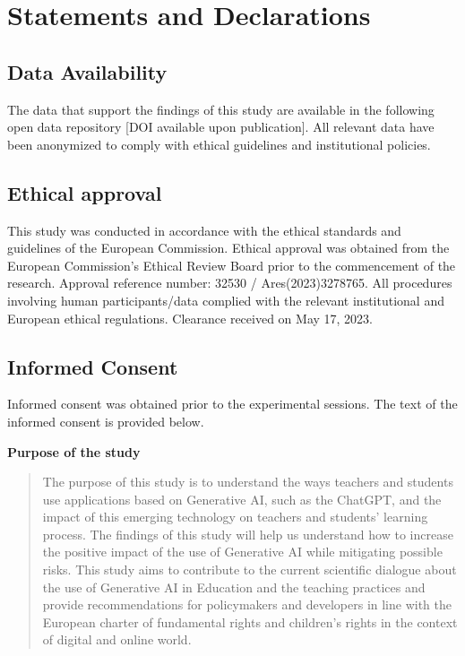 \documentclass[
  11pt,
]{article}
\begin{document}
\section{Statements and Declarations}\label{statements-and-declarations}

\subsection{Data Availability}\label{data-availability}

The data that support the findings of this study are available in the following open data repository {[}DOI available upon publication{]}. All relevant data have been anonymized to comply with ethical guidelines and institutional policies.

\subsection{Ethical approval}\label{ethical-approval}

This study was conducted in accordance with the ethical standards and guidelines of the European Commission. Ethical approval was obtained from the European Commission's Ethical Review Board prior to the commencement of the research. Approval reference number: 32530 / Ares(2023)3278765. All procedures involving human participants/data complied with the relevant institutional and European ethical regulations. Clearance received on May 17, 2023.

\subsection{Informed Consent}\label{informed-consent}

Informed consent was obtained prior to the experimental sessions. The text of the informed consent is provided below.

\textbf{Purpose of the study}

\begin{quote}
The purpose of this study is to understand the ways teachers and students use applications based on Generative AI, such as the ChatGPT, and the impact of this emerging technology on teachers and students' learning process. The findings of this study will help us understand how to increase the positive impact of the use of Generative AI while mitigating possible risks. This study aims to contribute to the current scientific dialogue about the use of Generative AI in Education and the teaching practices and provide recommendations for policymakers and developers in line with the European charter of fundamental rights and children's rights in the context of digital and online world.
\end{quote}
\end{document}
